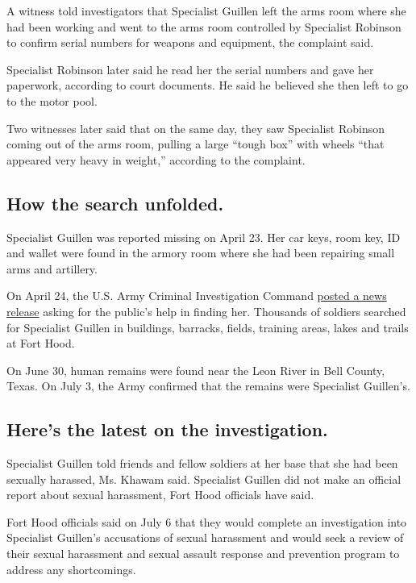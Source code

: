 A witness told investigators that Specialist Guillen left the arms room
where she had been working and went to the arms room controlled by
Specialist Robinson to confirm serial numbers for weapons and equipment,
the complaint said.

Specialist Robinson later said he read her the serial numbers and gave
her paperwork, according to court documents. He said he believed she
then left to go to the motor pool.

Two witnesses later said that on the same day, they saw Specialist
Robinson coming out of the arms room, pulling a large ``tough box'' with
wheels ``that appeared very heavy in weight,'' according to the
complaint.

\hypertarget{how-the-search-unfolded}{%
\subsection{How the search unfolded.}\label{how-the-search-unfolded}}

Specialist Guillen was reported missing on April 23. Her car keys, room
key, ID and wallet were found in the armory room where she had been
repairing small arms and artillery.

On April 24, the U.S. Army Criminal Investigation Command
\href{https://www.cid.army.mil/assets/docs/press-releases/Fort\%20Hood\%20Missing\%20Soldier.pdf}{posted
a news release} asking for the public's help in finding her. Thousands
of soldiers searched for Specialist Guillen in buildings, barracks,
fields, training areas, lakes and trails at Fort Hood.

On June 30, human remains were found near the Leon River in Bell County,
Texas. On July 3, the Army confirmed that the remains were Specialist
Guillen's.

\hypertarget{heres-the-latest-on-the-investigation}{%
\subsection{Here's the latest on the
investigation.}\label{heres-the-latest-on-the-investigation}}

Specialist Guillen told friends and fellow soldiers at her base that she
had been sexually harassed, Ms. Khawam said. Specialist Guillen did not
make an official report about sexual harassment, Fort Hood officials
have said.

Fort Hood officials said on July 6 that they would complete an
investigation into Specialist Guillen's accusations of sexual harassment
and would seek a review of their sexual harassment and sexual assault
response and prevention program to address any shortcomings.

